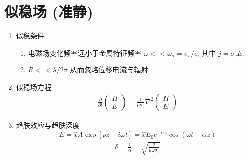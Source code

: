 \documentclass[../../note.tex]{subfiles}
\begin{document}
\section{似稳场 (准静)}
\begin{enumerate}
	\item 似稳条件
	\begin{enumerate}
		\item 电磁场变化频率远小于金属特征频率 $\omega<<\omega_\sigma=\sigma_c / \epsilon$, 其中 ${j}=\sigma_c {E}$.
		\item  $R<<\lambda / 2 \pi$ 从而忽略位移电流与辐射	
	\end{enumerate}
	\item 似稳场方程
	\begin{align}
	\frac{\partial}{\partial t}\left(\begin{array}{l}
		{H} \\
		{E}
	\end{array}\right)=\frac{1}{\mu \sigma_c} \nabla^2\left(\begin{array}{l}
		{H} \\
		{E}
	\end{array}\right)
\end{align}
	\item 趋肤效应与趋肤深度
	\begin{align}
		{E}=\hat{x} A \exp [p z-i \omega t]=\hat{x} E_0 e^{-\alpha z} \cos (\omega t-\alpha z) 	\end{align}
		\begin{align}
		\delta=\frac{1}{\alpha}=\sqrt{\frac{2}{\mu \omega \sigma_c}}
	\end{align}
\end{enumerate}
\end{document}
